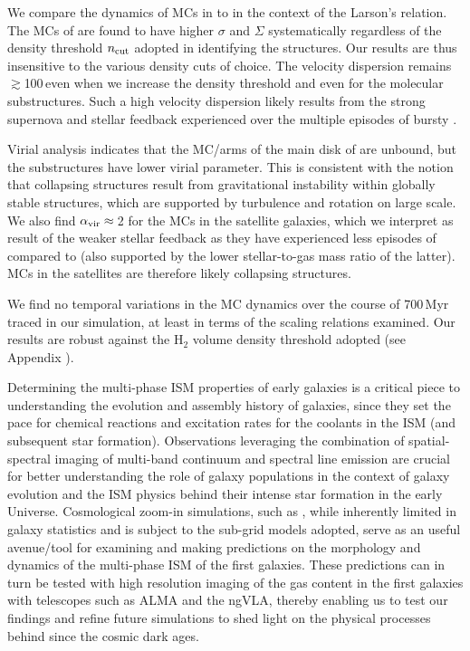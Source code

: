 \IfFileExists{emulateapjlegacy.cls}{\documentclass[iop]{emulateapjlegacy}}{\documentclass[iop]{emulateapj}}
\begin{document}
We compare the dynamics of MCs in \flower to \obs in the context of the Larson's relation.
The MCs of \flower are found to have higher $\sigma$ and $\Sigma$ systematically regardless of the 
density threshold $n_{\rm cut}$ adopted in identifying the structures.
Our results are thus insensitive to the various density cuts of choice.
The velocity dispersion remains $\gtrsim$100\,\kms even when we increase the 
density threshold and even for the molecular substructures.
Such a high velocity dispersion likely results from
the strong supernova and stellar feedback \flower experienced over the multiple episodes of bursty \SF.

Virial analysis indicates that the MC/arms of the main disk of \flower are unbound, but the substructures have lower virial parameter.
This is consistent with the notion that collapsing structures result from gravitational instability within globally stable structures, which are
supported by turbulence and rotation on large scale.
We also find $\alpha_{\rm vir}\approx$\,2 for the MCs in the satellite galaxies, which we interpret as
result of the weaker stellar feedback as they have
experienced less episodes of \SF compared to \flower 
(also supported by the lower stellar-to-gas mass ratio of the latter).
MCs in the satellites are therefore likely collapsing structures.

We find no temporal variations in the MC dynamics over the course of 700\,Myr traced in our simulation, 
at least in terms of the scaling relations examined.
Our results are robust against the H$_2$ volume density threshold adopted (see Appendix ).

Determining the multi-phase ISM properties of early galaxies
is a critical piece to understanding the evolution and
assembly history of galaxies, since they set the pace
for chemical reactions and excitation rates for the coolants in the ISM (and subsequent star formation).
Observations leveraging the combination of spatial-spectral imaging of
multi-band continuum and spectral line emission are crucial for better understanding
the role of \highz galaxy populations
in the context of galaxy evolution and the ISM physics behind their intense star formation in the early Universe.
Cosmological zoom-in simulations, such as , while inherently limited in galaxy
statistics and is subject to the sub-grid models adopted, 
serve as an useful avenue/tool for examining and making predictions on the morphology and dynamics of
the multi-phase ISM of the first galaxies.
These predictions can in turn be
tested with high resolution imaging of the gas content in the first galaxies with telescopes such as ALMA and the ngVLA, thereby 
enabling us to test our findings and refine future simulations to shed light on the physical processes behind 
\SF since the cosmic dark ages.
\end{document}
